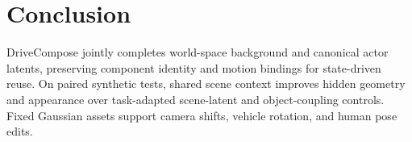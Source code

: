 \section{Conclusion}
\label{sec:conclusion}

DriveCompose jointly completes world-space background and canonical actor latents, preserving component identity and motion bindings for state-driven reuse. On paired synthetic tests, shared scene context improves hidden geometry and appearance over task-adapted scene-latent and object-coupling controls. Fixed Gaussian assets support camera shifts, vehicle rotation, and human pose edits.
\label{sec:main-text-end}
